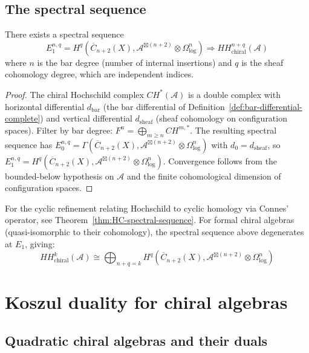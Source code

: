 \subsection{The spectral sequence}

\begin{theorem}\label{thm:hochschild-spectral-sequence}
There exists a spectral sequence
\[
E_1^{n,q} = H^q(\overline{C}_{n+2}(X), \mathcal{A}^{\boxtimes (n+2)} \otimes \Omega^n_{\log}) \Rightarrow HH^{n+q}_{\text{chiral}}(\mathcal{A})
\]
where $n$ is the bar degree (number of internal insertions) and $q$ is the sheaf cohomology degree, which are independent indices.
\end{theorem}

\begin{proof}
The chiral Hochschild complex $CH^*(\mathcal{A})$ is a double complex with horizontal differential $d_{\mathrm{bar}}$ (the bar differential of Definition~\ref{def:bar-differential-complete}) and vertical differential $d_{\mathrm{sheaf}}$ (sheaf cohomology on configuration spaces).  Filter by bar degree: $F^n = \bigoplus_{m \geq n} CH^{m,*}$.  The resulting spectral sequence has $E_0^{n,q} = \Gamma(\overline{C}_{n+2}(X), \mathcal{A}^{\boxtimes(n+2)} \otimes \Omega^n_{\log})$ with $d_0 = d_{\mathrm{sheaf}}$, so $E_1^{n,q} = H^q(\overline{C}_{n+2}(X), \mathcal{A}^{\boxtimes(n+2)} \otimes \Omega^n_{\log})$.  Convergence follows from the bounded-below hypothesis on $\mathcal{A}$ and the finite cohomological dimension of configuration spaces.
\end{proof}

For the cyclic refinement relating Hochschild to cyclic homology via Connes' operator, see Theorem~\ref{thm:HC-spectral-sequence}.  For formal chiral algebras (quasi-isomorphic to their cohomology), the spectral sequence above degenerates at $E_1$, giving:
\[
HH^k_{\text{chiral}}(\mathcal{A}) \cong \bigoplus_{n+q=k} H^q(\overline{C}_{n+2}(X), \mathcal{A}^{\boxtimes (n+2)} \otimes \Omega^n_{\log})
\]

\section{Koszul duality for chiral algebras}

\subsection{Quadratic chiral algebras and their duals}

